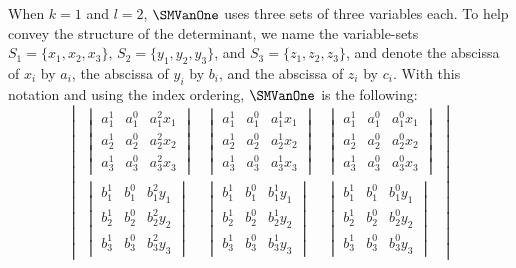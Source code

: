\begin{example}
  \label{ex.smvan1.k1l2}
  When \(k=1\) and \(l=2\), \(\SMVanOne\) uses three sets of three
  variables each.
  To help convey the structure of the determinant,
  we name the variable-sets
  \(S_1 = \{x_1,x_2,x_3\}\),
  \(S_2 = \{y_1,y_2,y_3\}\), and
  \(S_3 = \{z_1,z_2,z_3\}\),
  and denote the abscissa of \(x_i\) by \(a_i\),
  the abscissa of \(y_i\) by \(b_i\),
  and the abscissa of \(z_i\) by \(c_i\).
  With this notation and using the index ordering, \(\SMVanOne\) is the following:
  \begingroup\renewcommand{\arraystretch}{1.5}
  \[
    \begin{vmatrix*}
      \begin{vmatrix*}
        a_1^1 & a_1^0 & a_1^2 x_1 \\
        a_2^1 & a_2^0 & a_2^2 x_2 \\
        a_3^1 & a_3^0 & a_3^2 x_3
      \end{vmatrix*}
      &
      \begin{vmatrix*}
        a_1^1 & a_1^0 & a_1^1 x_1 \\
        a_2^1 & a_2^0 & a_2^1 x_2 \\
        a_3^1 & a_3^0 & a_3^1 x_3 
      \end{vmatrix*}
      &
      \begin{vmatrix*}
        a_1^1 & a_1^0 & a_1^0 x_1 \\
        a_2^1 & a_2^0 & a_2^0 x_2 \\
        a_3^1 & a_3^0 & a_3^0 x_3 
      \end{vmatrix*}
      \\
      \begin{vmatrix*}
        b_1^1 & b_1^0 & b_1^2 y_1 \\
        b_2^1 & b_2^0 & b_2^2 y_2 \\
        b_3^1 & b_3^0 & b_3^2 y_3 
      \end{vmatrix*}
      &
      \begin{vmatrix*}
        b_1^1 & b_1^0 & b_1^1 y_1 \\
        b_2^1 & b_2^0 & b_2^1 y_2 \\
        b_3^1 & b_3^0 & b_3^1 y_3 
      \end{vmatrix*}
      &
      \begin{vmatrix*}
        b_1^1 & b_1^0 & b_1^0 y_1 \\
        b_2^1 & b_2^0 & b_2^0 y_2 \\
        b_3^1 & b_3^0 & b_3^0 y_3 
      \end{vmatrix*}

\end{vmatrix*}\]
\end{example}
